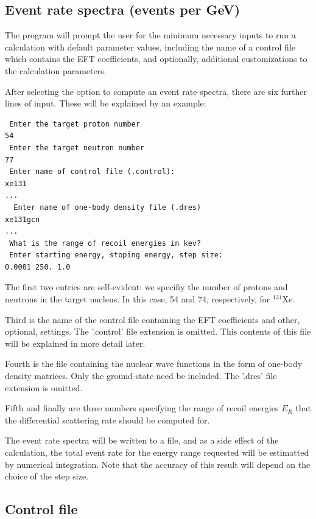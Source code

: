\documentclass[11pt]{article}
\begin{document}
\subsection{Event rate spectra (events per GeV)}
The program will prompt the user for 
the minimum necessary inputs to run a calculation with default parameter 
values, including the name of a control file which contains the EFT
coefficients, and optionally, additional customizations to the calculation
parameters.

After selecting the option to compute an event rate spectra, there are six
further lines of input. These will be explained by an example:

\begin{verbatim}
 Enter the target proton number
54
 Enter the target neutron number 
77 
 Enter name of control file (.control):
xe131
...
  Enter name of one-body density file (.dres)
xe131gcn
...
 What is the range of recoil energies in kev?
 Enter starting energy, stoping energy, step size:
0.0001 250. 1.0
\end{verbatim}

The first two entries are self-evident: we specifiy the number of protons and
neutrons in the target nucleus. In this case, 54 and 74, respectively, for
$^{131}$Xe.

Third is the name of the control file containing the EFT coefficients and other,
optional, settings. The '.control' file extension is omitted. This contents of
this file will be explained in more detail later.

Fourth is the file containing the nuclear wave functions in the form of one-body
density matrices. Only the ground-state need be included. The '.dres' file
extension is omitted. 

Fifth and finally are three numbers specifying the range of recoil energies
$E_R$ that the differential scattering rate should be computed for.

The event rate spectra will be written to a file, and as a side effect of the
calculation, the total event rate for the energy range requested will be
estimatted by numerical integration. Note that the accuracy of this result will
depend on the choice of the step size.

\subsection{Control file}
\end{document}

